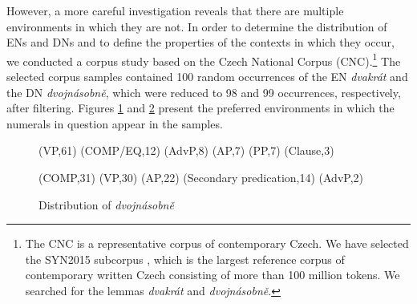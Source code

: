 \documentclass[output=paper,
modfonts,
hidelinks,
newtxmath
]{langscibook}
\begin{document}
\noindent However, a more careful investigation reveals that there are multiple environments in which they are not. In order to determine the distribution of ENs and DNs and to define the properties of the contexts in which they occur, we conducted a corpus study based on the Czech National Corpus (CNC).\footnote{The CNC is a representative corpus of contemporary Czech. We have selected the SYN2015 subcorpus \citep{kren-etal2015}, which is the largest reference corpus of contemporary written Czech consisting of more than 100 million tokens. We searched for the lemmas \textit{dvakrát} and \textit{dvojnásobně}.} The selected corpus samples contained 100 random occurrences of the EN \textit{dvakrát} and the DN \textit{dvojnásobně}, which were reduced to 98 and 99 occurrences, respectively, after filtering. Figures \ref{fig:distr_dvakrat} and \ref{fig:distr_dvojnasobne} present the preferred environments in which the numerals in question appear in the samples.

\begin{figure}[t]
\label{fig:distr_dvakrat}

\footnotesize
{}%
{
(VP,61)
(COMP/EQ,12)
(AdvP,8)
(AP,7)
(PP,7)
(Clause,3)
}
\end{figure}

\normalsize
\begin{figure}
\caption{Distribution of \textit{dvojnásobně}}
\footnotesize
\label{fig:distr_dvojnasobne}
%
{
(COMP,31)
(VP,30)
(AP,22)
(Secondary predication,14)
(AdvP,2)
}
\end{figure}
\normalsize

\end{document}
